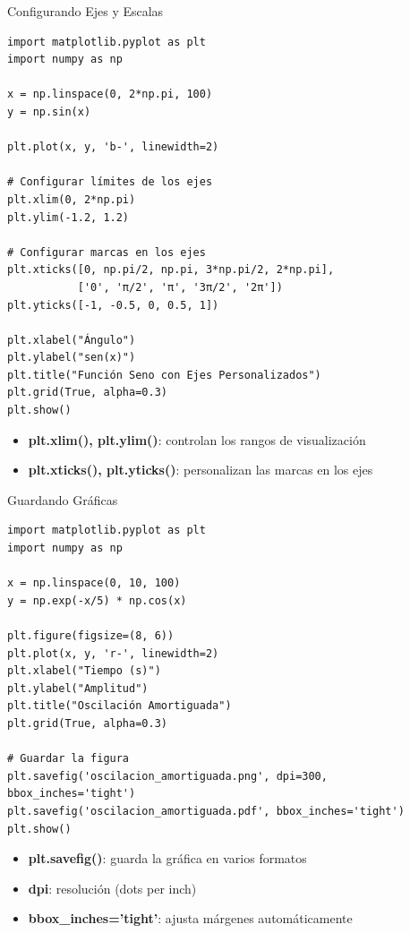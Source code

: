 \documentclass[10pt]{beamer}
\begin{document}
\begin{frame}[fragile]{Configurando Ejes y Escalas}
\begin{verbatim}
import matplotlib.pyplot as plt
import numpy as np

x = np.linspace(0, 2*np.pi, 100)
y = np.sin(x)

plt.plot(x, y, 'b-', linewidth=2)

# Configurar límites de los ejes
plt.xlim(0, 2*np.pi)
plt.ylim(-1.2, 1.2)

# Configurar marcas en los ejes
plt.xticks([0, np.pi/2, np.pi, 3*np.pi/2, 2*np.pi], 
           ['0', 'π/2', 'π', '3π/2', '2π'])
plt.yticks([-1, -0.5, 0, 0.5, 1])

plt.xlabel("Ángulo")
plt.ylabel("sen(x)")
plt.title("Función Seno con Ejes Personalizados")
plt.grid(True, alpha=0.3)
plt.show()
\end{verbatim}

\begin{itemize}
  \item \textbf{plt.xlim(), plt.ylim()}: controlan los rangos de visualización
  \item \textbf{plt.xticks(), plt.yticks()}: personalizan las marcas en los ejes
\end{itemize}
\end{frame}

\begin{frame}[fragile]{Guardando Gráficas}
\begin{verbatim}
import matplotlib.pyplot as plt
import numpy as np

x = np.linspace(0, 10, 100)
y = np.exp(-x/5) * np.cos(x)

plt.figure(figsize=(8, 6))
plt.plot(x, y, 'r-', linewidth=2)
plt.xlabel("Tiempo (s)")
plt.ylabel("Amplitud")
plt.title("Oscilación Amortiguada")
plt.grid(True, alpha=0.3)

# Guardar la figura
plt.savefig('oscilacion_amortiguada.png', dpi=300, bbox_inches='tight')
plt.savefig('oscilacion_amortiguada.pdf', bbox_inches='tight')
plt.show()
\end{verbatim}

\begin{itemize}
  \item \textbf{plt.savefig()}: guarda la gráfica en varios formatos
  \item \textbf{dpi}: resolución (dots per inch)
  \item \textbf{bbox\_inches='tight'}: ajusta márgenes automáticamente
\end{itemize}
\end{frame}
\end{document}
